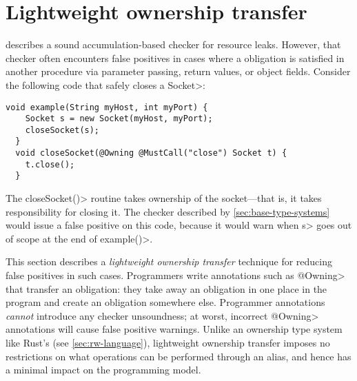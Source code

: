 \section{Lightweight ownership transfer}
\label{sec:lightweight-ownership}



 describes a sound accumulation-based
checker for resource leaks. However, that checker often encounters false
positives in cases where a \MustCall obligation is satisfied
in another procedure via parameter passing, return values, or object fields.
Consider the following code that safely closes a \<Socket>:

\begin{lstlisting}[frame=tb,belowskip=3mm]
  void example(String myHost, int myPort) {
    Socket s = new Socket(myHost, myPort);
    closeSocket(s);
  }
  void closeSocket(@Owning @MustCall("close") Socket t) {
    t.close();
  }  
\end{lstlisting}

The \<closeSocket()> routine takes ownership of the socket---that is,
it takes responsibility for closing it. The checker described by
\cref{sec:base-type-systems} would issue a false positive on this
code, because it would warn when \<s>
goes out of scope at the end of \<example()>.

This section describes a \emph{lightweight ownership transfer} technique for reducing
false positives in such cases.
Programmers write annotations such as \<@Owning> that transfer an
obligation:  they take away an obligation
in one place in the program and create an obligation somewhere else.
Programmer
annotations \emph{cannot} introduce any checker unsoundness; at worst,
incorrect \<@Owning> annotations will cause false positive warnings.
Unlike an ownership type system like Rust's (see \cref{sec:rw-language}),
lightweight ownership transfer imposes no restrictions on what operations can be performed
through an alias, and hence has a minimal impact on the programming model.

